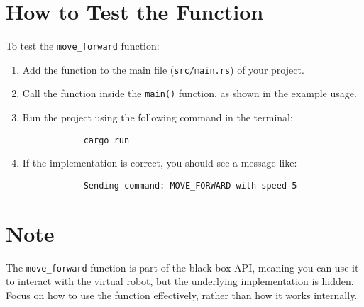 \documentclass[12pt]{article}
\begin{document}
	\section*{How to Test the Function}
	To test the \texttt{move\_forward} function:
	\begin{enumerate}
		\item Add the function to the main file (\texttt{src/main.rs}) of your project.
		\item Call the function inside the \texttt{main()} function, as shown in the example usage.
		\item Run the project using the following command in the terminal:
		\begin{lstlisting}
			cargo run
		\end{lstlisting}
		\item If the implementation is correct, you should see a message like:
		\begin{lstlisting}
			Sending command: MOVE_FORWARD with speed 5
		\end{lstlisting}
	\end{enumerate}
	
	\section*{Note}
	The \texttt{move\_forward} function is part of the black box API, meaning you can use it to interact with the virtual robot, but the underlying implementation is hidden. Focus on how to use the function effectively, rather than how it works internally.
	
\end{document}
